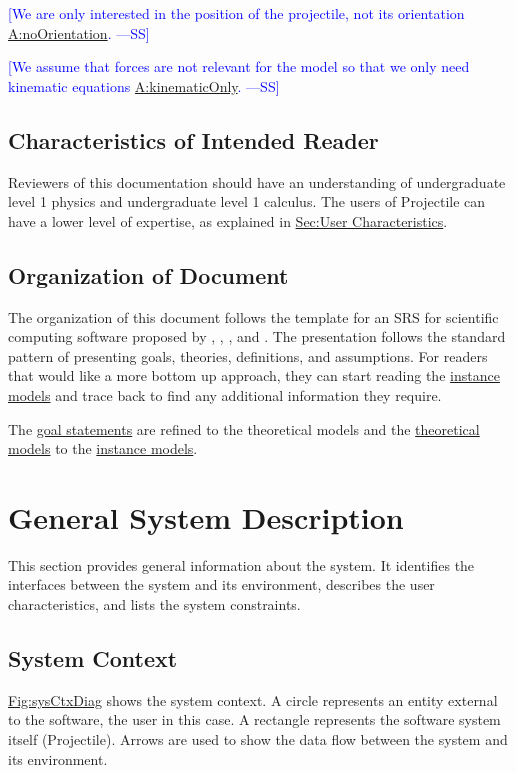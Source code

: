 \documentclass[12pt]{article}
\newcommand{\authornote}[3]{\textcolor{#1}{[#3 ---#2]}}
\newcommand{\authornote}[3]{}
\newcommand{\wss}[1]{\authornote{blue}{SS}{#1}}
\begin{document}
\wss{We are only interested in the position of the projectile, not
its orientation \hyperref[noOrientation]{A:noOrientation}.} %

\wss{We assume that forces are not relevant for the model so that we only need kinematic equations \hyperref[kinematicOnly]{A:kinematicOnly}.}

\subsection{Characteristics of Intended Reader}
\label{Sec:ReaderChars}
Reviewers of this documentation should have an understanding of undergraduate level 1 physics and undergraduate level 1 calculus. The users of Projectile can have a lower level of expertise, as explained in \hyperref[Sec:UserChars]{Sec:User Characteristics}.

\subsection{Organization of Document}
\label{Sec:DocOrg}
The organization of this document follows the template for an SRS for scientific computing software proposed by \cite{koothoor2013}, \cite{smithLai2005}, \cite{smithEtAl2007}, and \cite{smithKoothoor2016}. The presentation follows the standard pattern of presenting goals, theories, definitions, and assumptions. For readers that would like a more bottom up approach, they can start reading the \hyperref[Sec:IMs]{instance models} and trace back to find any additional information they require.

The \hyperref[Sec:GoalStmt]{goal statements} are refined to the theoretical models and the \hyperref[Sec:TMs]{theoretical models} to the \hyperref[Sec:IMs]{instance models}.

\section{General System Description}
\label{Sec:GenSysDesc}
This section provides general information about the system. It identifies the interfaces between the system and its environment, describes the user characteristics, and lists the system constraints.

\subsection{System Context}
\label{Sec:SysContext}
\hyperref[Figure:sysCtxDiag]{Fig:sysCtxDiag} shows the system context. A circle represents an entity external to the software, the user in this case. A rectangle represents the software system itself (Projectile). Arrows are used to show the data flow between the system and its environment.
\end{document}
